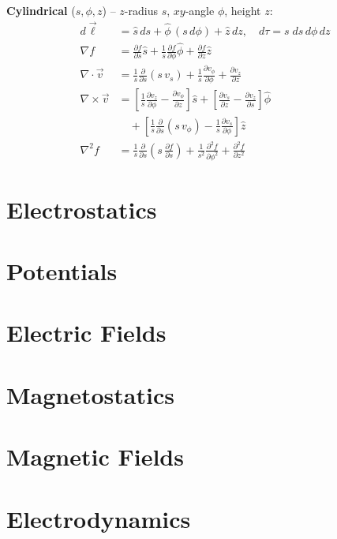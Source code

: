 \documentclass[12pt, a4paper]{article}
\begin{document}
\begin{multicols*}{3}
\textbf{Cylindrical} ($s, \phi, z$) -- $z$-radius $s$, $xy$-angle $\phi$, height $z$:
\begin{align*}
  d\vec{\ell} &= \hat{s}\,ds 
        + \hat{\phi}\,(s\,d\phi)
        + \hat{z}\,dz,\quad d\tau = s \; ds\,d\phi\,dz\\
  \nabla f &= \frac{\partial f}{\partial s}\hat{s}
           + \frac{1}{s}\frac{\partial f}{\partial \phi}\hat{\phi}
           + \frac{\partial f}{\partial z}\hat{z}\\
  \nabla \cdot \vec{v} &= \frac{1}{s}\frac{\partial}{\partial s}(s\, v_{s})
                       + \frac{1}{s}\frac{\partial v_{\phi}}{\partial \phi}
                       + \frac{\partial v_{z}}{\partial z}\\
  \nabla \times \vec{v} &= \left[\frac{1}{s}\frac{\partial v_{z}}{\partial \phi}
                          - \frac{\partial v_{\phi}}{\partial z}\right]\hat{s}
                        + \left[\frac{\partial v_{s}}{\partial z}
                          - \frac{\partial v_{z}}{\partial s}\right]\hat{\phi}\\
                        &\quad + \left[\frac{1}{s}\frac{\partial}{\partial s}(s\, v_{\phi})
                          - \frac{1}{s}\frac{\partial v_{s}}{\partial \phi}\right]\hat{z}\\
  \nabla^{2} f &= \frac{1}{s}\frac{\partial}{\partial s}\!\left(s\,\frac{\partial f}{\partial s}\right)
               + \frac{1}{s^{2}}\frac{\partial^{2} f}{\partial \phi^{2}}
               + \frac{\partial^{2} f}{\partial z^{2}}
\end{align*}

\colbreak
\section{Electrostatics}

\colbreak
\section{Potentials}
\section{Electric Fields}
\section{Magnetostatics}
\section{Magnetic Fields}
\section{Electrodynamics}
\end{multicols*}
\end{document}
